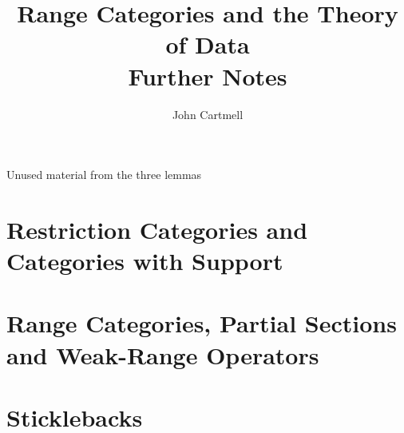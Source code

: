 \documentclass[10pt,a4paper]{article}
\theoremstyle{remark}
\begin{document}
\title{Range Categories and the Theory of Data\\[0.5em]
\large Further Notes}

\author{John Cartmell}
\date{}
\maketitle
\begin{center}
Unused material from the three lemmas
\end{center}

\newcommand{\fgsourcediag}{$\binarysourcediag{a}{b}{c}{f}{g}$}
\newcommand{\fgsinkdiag}{$\binarysinkdiag{a}{b}{c}{f}{g}$}
\newcommand{\FGsourcediag}{$\binarysourcediag{a}{b}{c}{F}{G}$}
\newcommand{\FGsinkdiag}{$\binarysinkdiag{a}{b}{c}{F}{G}$}

\section{Restriction Categories and Categories with Support}



\section{Range Categories, Partial Sections and Weak-Range Operators}
 


\section{Sticklebacks}

\newpage
\end{document}

